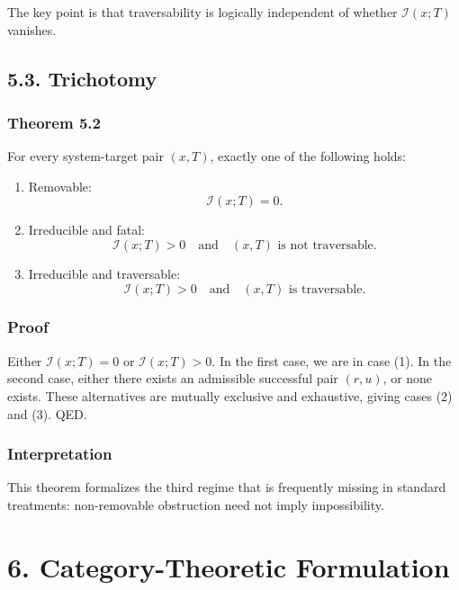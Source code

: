 \documentclass[
]{article}
\begin{document}
The key point is that traversability is logically independent of whether
\(\mathcal{I}(x;T)\) vanishes.

\subsection{5.3. Trichotomy}\label{trichotomy}

\subsubsection{Theorem 5.2}\label{theorem-5.2}

For every system-target pair \((x,T)\), exactly one of the following
holds:

\begin{enumerate}
\def\labelenumi{\arabic{enumi}.}
\item
  Removable: \[
  \mathcal{I}(x;T)=0.
  \]
\item
  Irreducible and fatal: \[
  \mathcal{I}(x;T)>0
  \quad\text{and}\quad
  (x,T)\text{ is not traversable.}
  \]
\item
  Irreducible and traversable: \[
  \mathcal{I}(x;T)>0
  \quad\text{and}\quad
  (x,T)\text{ is traversable.}
  \]
\end{enumerate}

\subsubsection{Proof}\label{proof-4}

Either \(\mathcal{I}(x;T)=0\) or \(\mathcal{I}(x;T)>0\). In the first
case, we are in case (1). In the second case, either there exists an
admissible successful pair \((r,u)\), or none exists. These alternatives
are mutually exclusive and exhaustive, giving cases (2) and (3). QED.

\subsubsection{Interpretation}\label{interpretation}

This theorem formalizes the third regime that is frequently missing in
standard treatments: non-removable obstruction need not imply
impossibility.

\section{6. Category-Theoretic
Formulation}\label{category-theoretic-formulation}
\end{document}
